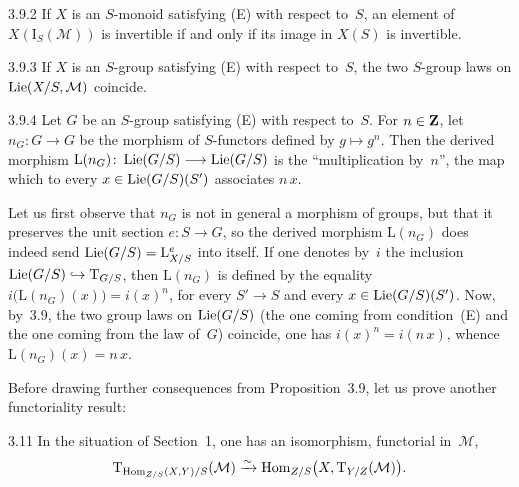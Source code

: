 \begin{corollary}{3.9.2}\label{II.3.9.2}
If \(X\) is an \(S\)-monoid satisfying \textup{(E)} with respect to~\(S\), an
element of \(X(\mathrm{I}_{S}(\mathcal{M}))\) is invertible if and only if its
image in \(X(S)\) is invertible.
\end{corollary}

\begin{corollary}{3.9.3}\label{II.3.9.3}
If \(X\) is an \(S\)-group satisfying \textup{(E)} with respect to~\(S\), the
two \(S\)-group laws on \(\operatorname{Lie}(X/S,\mathcal{M})\) coincide.
\end{corollary}

\begin{corollary}{3.9.4}\label{II.3.9.4}%
{\renewcommand{\thefootnote}{(35)}}
Let \(G\) be an \(S\)-group satisfying \textup{(E)} with respect to~\(S\). For
\(n\in\mathbf{Z}\), let \(n_{G}\colon G\to G\) be the morphism of \(S\)-functors
defined by \(g\mapsto g^{n}\). Then the derived morphism
\(\mathrm{L}(n_{G})\colon\operatorname{Lie}(G/S)\longrightarrow\operatorname{Lie}(G/S)\) is the ``multiplication
by~\(n\)'', \ie the map which to every \(x\in\operatorname{Lie}(G/S)(S')\) associates
\(n\,x\).
\end{corollary}

Let us first observe that \(n_{G}\) is not in general a morphism of groups,
but that it preserves the unit section \(e\colon S\to G\), so the derived
morphism \(\mathrm{L}(n_{G})\) does indeed send
\(\operatorname{Lie}(G/S)=\mathrm{L}^{e}_{X/S}\) into itself.
If one denotes by~\(i\) the inclusion
\(\operatorname{Lie}(G/S)\hookrightarrow\mathrm{T}_{G/S}\), then \(\mathrm{L}(n_{G})\) is
defined by the equality \(i\bigl(\mathrm{L}(n_{G})(x)\bigr)=i(x)^{n}\), for
every \(S'\to S\) and every \(x\in\operatorname{Lie}(G/S)(S')\). Now, by~3.9, the two group
laws on \(\operatorname{Lie}(G/S)\) (the one coming from condition~\textup{(E)} and the one
coming from the law of~\(G\)) coincide, \ie one has
\(i(x)^{n}=i(n\,x)\), whence \(\mathrm{L}(n_{G})(x)=n\,x\).

Before drawing further consequences from Proposition~3.9, let us prove
another functoriality result:

\begin{proposition}{3.11}\label{II.3.11}
In the situation of Section~1, one has an isomorphism, functorial
in~\(\mathcal{M}\),
\[
\mathrm{T}_{\operatorname{Hom}_{Z/S}(X,Y)/S}(\mathcal{M})
\xrightarrow{\sim}
\operatorname{Hom}_{Z/S}\bigl(X,\mathrm{T}_{Y/Z}(\mathcal{M})\bigr).
\]
\end{proposition}

